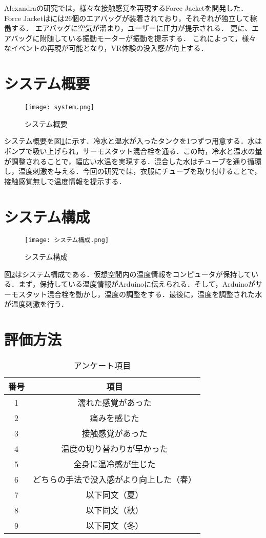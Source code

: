 \documentclass[uplatex]{jsarticle}   %
\begin{document}
Alexandraの研究では，様々な接触感覚を再現するForce Jacketを開発した．
Force Jacketはには26個のエアバッグが装着されており，それぞれが独立して稼働する．
エアバッグに空気が溜まり，ユーザーに圧力が提示される．
更に、エアバッグに附随している振動モーターが振動を提示する．
これによって，様々なイベントの再現が可能となり，VR体験の没入感が向上する．


\section{システム概要}
\begin{figure}[htbp]
    \centering
    \texttt{[image: system.png]}
    \caption{システム概要}
    \label{fig:env}
\end{figure}
システム概要を図\ref{fig:env}に示す．冷水と温水が入ったタンクを1つずつ用意する．水はポンプで吸い上げられ，サーモスタット混合栓を通る．この時，冷水と温水の量が調整されることで，幅広い水温を実現する．混合した水はチューブを通り循環し，温度刺激を与える．今回の研究では，衣服にチューブを取り付けることで，接触感覚無しで温度情報を提示する．


\section{システム構成}
\begin{figure}[htbp]
    \centering
    \texttt{[image: システム構成.png]}
    \caption{システム構成}
    \label{fig:sys}
\end{figure}
図\ref{fig:sys}はシステム構成である．仮想空間内の温度情報をコンピュータが保持している．まず，保持している温度情報がArduinoに伝えられる．そして，Arduinoがサーモスタット混合栓を動かし，温度の調整をする．最後に，温度を調整された水が温度刺激を行う．


\section{評価方法}
\begin{table}[H]
    \centering
    \caption{アンケート項目}\label{tab:fuga}
    \begin{tabular}{c|c}\hline
    番号 & 項目  \\ \hline
    1 & 濡れた感覚があった  \\
    2 & 痛みを感じた  \\
    3 & 接触感覚があった  \\
    4 & 温度の切り替わりが早かった  \\
    5 & 全身に温冷感が生じた  \\
    6 & どちらの手法で没入感がより向上した（春）  \\
    7 & 以下同文（夏）  \\
    8 & 以下同文（秋）  \\
    9 & 以下同文（冬）  \\ \hline
    \end{tabular}
\end{table}
\end{document}
